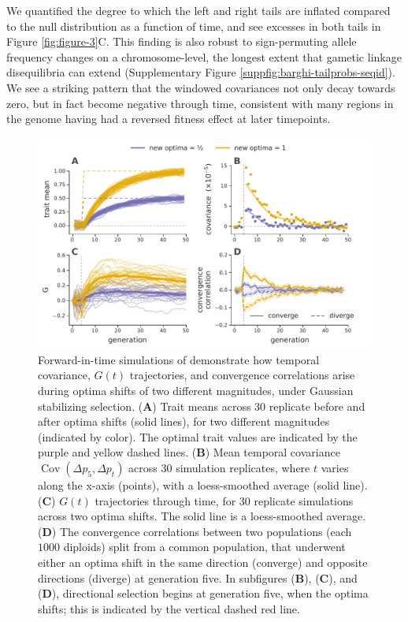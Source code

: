 \documentclass[11pt]{article}
\DeclareMathOperator{\cov}{Cov}
\begin{document}
We quantified the degree to which the left and
right tails are inflated compared to the null distribution as a function of
time, and see excesses in both tails in Figure \ref{fig:figure-3}C. This
finding is also robust to sign-permuting allele frequency changes on a
chromosome-level, the longest extent that gametic linkage disequilibria can
extend (Supplementary Figure \ref{suppfig:barghi-tailprobs-seqid}). We see a
striking pattern that the windowed covariances not only decay towards zero, but
in fact become negative through time, consistent with many regions in the
genome having had a reversed fitness effect at later timepoints.

\begin{figure}[!htb]
  \centering
  \includegraphics[width=\textwidth]{figures/figure-4-edited.pdf}

  \caption{Forward-in-time simulations of demonstrate how temporal covariance,
    $G(t)$ trajectories, and convergence correlations arise during optima
    shifts of two different magnitudes, under Gaussian stabilizing selection.
    ({\bf A}) Trait means across 30 replicate before and after optima shifts (solid
    lines), for two different magnitudes (indicated by color). The optimal
    trait values are indicated by the purple and yellow dashed lines.  ({\bf B}) Mean
    temporal covariance $\cov(\Delta p_5, \Delta p_t)$ across 30 simulation
    replicates, where $t$ varies along the x-axis (points), with a
    loess-smoothed average (solid line). ({\bf C}) $G(t)$ trajectories through time,
    for 30 replicate simulations across two optima shifts. The solid line is a
    loess-smoothed average. ({\bf D}) The convergence correlations between two
    populations (each $1000$ diploids) split from a common population, that
    underwent either an optima shift in the same direction (converge) and
    opposite directions (diverge) at generation five. In subfigures ({\bf B}), ({\bf C}),
    and ({\bf D}), directional selection begins at generation five, when the optima
    shifts; this is indicated by the vertical dashed red line.}

  \label{fig:figure-4}
\end{figure}
\end{document}

